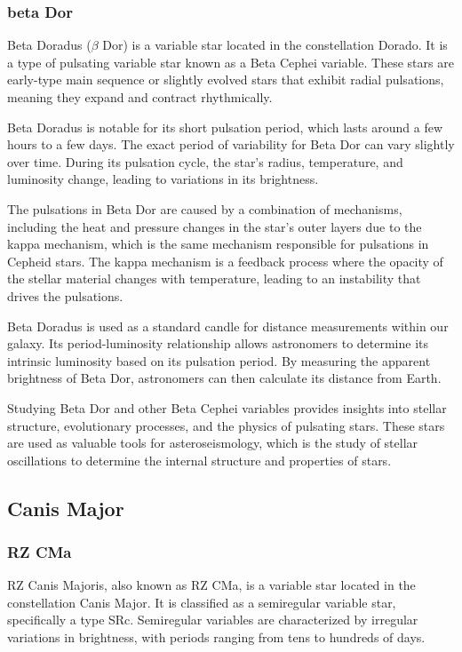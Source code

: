 \subsubsection*{ beta Dor }
Beta Doradus ($\beta$ Dor) is a variable star located in the constellation Dorado. It is a type of pulsating variable star known as a Beta Cephei variable. These stars are early-type main sequence or slightly evolved stars that exhibit radial pulsations, meaning they expand and contract rhythmically.

Beta Doradus is notable for its short pulsation period, which lasts around a few hours to a few days. The exact period of variability for Beta Dor can vary slightly over time. During its pulsation cycle, the star's radius, temperature, and luminosity change, leading to variations in its brightness.

The pulsations in Beta Dor are caused by a combination of mechanisms, including the heat and pressure changes in the star's outer layers due to the kappa mechanism, which is the same mechanism responsible for pulsations in Cepheid stars. The kappa mechanism is a feedback process where the opacity of the stellar material changes with temperature, leading to an instability that drives the pulsations.

Beta Doradus is used as a standard candle for distance measurements within our galaxy. Its period-luminosity relationship allows astronomers to determine its intrinsic luminosity based on its pulsation period. By measuring the apparent brightness of Beta Dor, astronomers can then calculate its distance from Earth.

Studying Beta Dor and other Beta Cephei variables provides insights into stellar structure, evolutionary processes, and the physics of pulsating stars. These stars are used as valuable tools for asteroseismology, which is the study of stellar oscillations to determine the internal structure and properties of stars.






\subsection{Canis Major}
\subsubsection*{ RZ CMa }
RZ Canis Majoris, also known as RZ CMa, is a variable star located in the constellation Canis Major. It is classified as a semiregular variable star, specifically a type SRc. Semiregular variables are characterized by irregular variations in brightness, with periods ranging from tens to hundreds of days.

